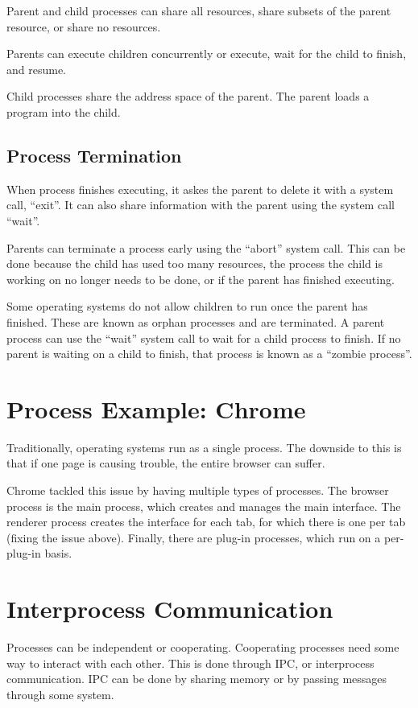 \documentclass{article}
\begin{document}
Parent and child processes can share all resources, share subsets of the parent
resource, or share no resources.

Parents can execute children concurrently or execute, wait for the child to
finish, and resume.

Child processes share the address space of the parent. The parent loads a
program into the child.

\subsection{Process Termination}
When process finishes executing, it askes the parent to delete it with a system
call, ``exit''. It can also share information with the parent using the system
call ``wait''.

Parents can terminate a process early using the ``abort'' system call. This can
be done because the child has used too many resources, the process the child is
working on no longer needs to be done, or if the parent has finished executing.

Some operating systems do not allow children to run once the parent has
finished. These are known as orphan processes and are terminated. A parent
process can use the ``wait'' system call to wait for a child process to finish.
If no parent is waiting on a child to finish, that process is known as a
``zombie process''.

\section{Process Example: Chrome}
Traditionally, operating systems run as a single process. The downside to this
is that if one page is causing trouble, the entire browser can suffer.

Chrome tackled this issue by having multiple types of processes. The browser
process is the main process, which creates and manages the main interface. The
renderer process creates the interface for each tab, for which there is one per
tab (fixing the issue above). Finally, there are plug-in processes, which run
on a per-plug-in basis.

\section{Interprocess Communication}
Processes can be independent or cooperating. Cooperating processes need some
way to interact with each other. This is done through IPC, or interprocess
communication. IPC can be done by sharing memory or by passing messages
through some system.
\end{document}
